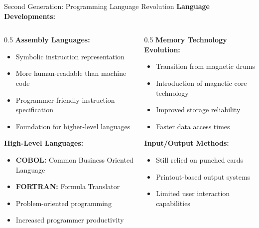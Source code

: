 \documentclass[aspectratio=169]{beamer}
\begin{document}
\begin{frame}{Second Generation: Programming Language Revolution}
    \textbf{Language Developments:}
    
    \begin{columns}
        \begin{column}{0.5\textwidth}
            \textbf{Assembly Languages:}
            \begin{itemize}
                \item Symbolic instruction representation
                \item More human-readable than machine code
                \item Programmer-friendly instruction specification
                \item Foundation for higher-level languages
            \end{itemize}
            
            \vspace{0.3cm}
            \textbf{High-Level Languages:}
            \begin{itemize}
                \item \textbf{COBOL:} Common Business Oriented Language
                \item \textbf{FORTRAN:} Formula Translator
                \item Problem-oriented programming
                \item Increased programmer productivity
            \end{itemize}
        \end{column}
        \begin{column}{0.5\textwidth}
            \textbf{Memory Technology Evolution:}
            \begin{itemize}
                \item Transition from magnetic drums
                \item Introduction of magnetic core technology
                \item Improved storage reliability
                \item Faster data access times
            \end{itemize}
            
            \vspace{0.3cm}
            \textbf{Input/Output Methods:}
            \begin{itemize}
                \item Still relied on punched cards
                \item Printout-based output systems
                \item Limited user interaction capabilities
            \end{itemize}
        \end{column}
    \end{columns}
 
\end{frame}
\end{document}
